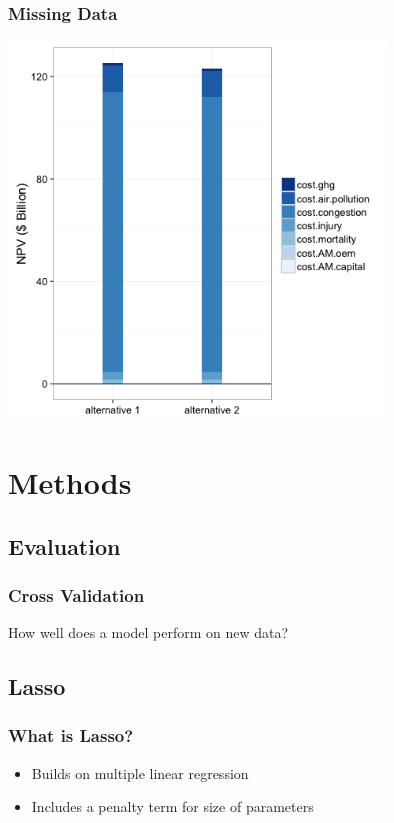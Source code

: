 \documentclass{beamer}
\begin{document}
\begin{frame}
  \frametitle{Missing Data}
  \centering
  \includegraphics[width=0.75\textwidth]{../../R/barplot1}
\end{frame}

\section{Methods}

\subsection{Evaluation}
\begin{frame}
  \frametitle{Cross Validation}
  How well does a model perform on new data?
  \centering
\end{frame}

\subsection{Lasso}
\begin{frame}
  \frametitle{What is Lasso?}
  \begin{itemize}
    \item Builds on multiple linear regression
    \item Includes a penalty term for size of parameters
  \end{itemize}
  \centering
\end{frame}
\end{document}
